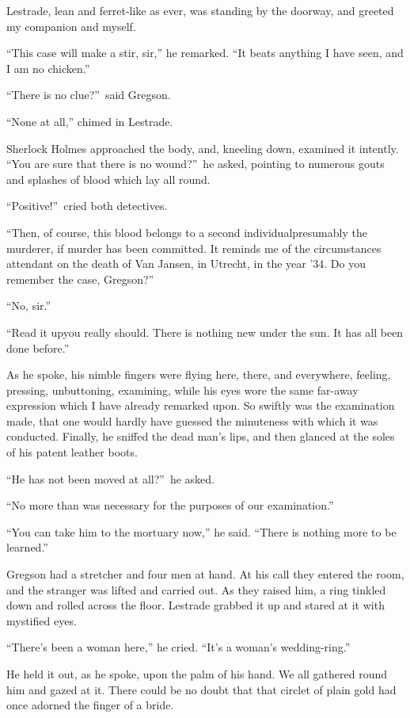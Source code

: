 \documentclass[12pt,english]{book}
\begin{document}
Lestrade, lean and ferret-like as ever, was standing by the doorway,
and greeted my companion and myself.

{}``This case will make a stir, sir,'' he remarked. {}``It beats
anything I have seen, and I am no chicken.''

{}``There is no clue?''\ said Gregson.

{}``None at all,'' chimed in Lestrade.

Sherlock Holmes approached the body, and, kneeling down, examined
it intently. {}``You are sure that there is no wound?''\ he asked,
pointing to numerous gouts and splashes of blood which lay all round.

{}``Positive!''\ cried both detectives.

{}``Then, of course, this blood belongs to a second individual\mdsh{---}presumably
the murderer, if murder has been committed. It reminds me of the circumstances
attendant on the death of Van Jansen, in Utrecht, in the year '34.
Do you remember the case, Gregson?''

{}``No, sir.''

{}``Read it up\mdsh{---}you really should. There is nothing new
under the sun. It has all been done before.''

As he spoke, his nimble fingers were flying here, there, and everywhere,
feeling, pressing, unbuttoning, examining, while his eyes wore the
same far-away expression which I have already remarked upon. So swiftly
was the examination made, that one would hardly have guessed the minuteness
with which it was conducted. Finally, he sniffed the dead man's lips,
and then glanced at the soles of his patent leather boots.

{}``He has not been moved at all?''\ he asked.

{}``No more than was necessary for the purposes of our examination.''

{}``You can take him to the mortuary now,'' he said. {}``There
is nothing more to be learned.''

Gregson had a stretcher and four men at hand. At his call they entered
the room, and the stranger was lifted and carried out. As they raised
him, a ring tinkled down and rolled across the floor. Lestrade grabbed
it up and stared at it with mystified eyes.

{}``There's been a woman here,'' he cried. {}``It's a woman's wedding-ring.''

He held it out, as he spoke, upon the palm of his hand. We all gathered
round him and gazed at it. There could be no doubt that that circlet
of plain gold had once adorned the finger of a bride.
\end{document}
